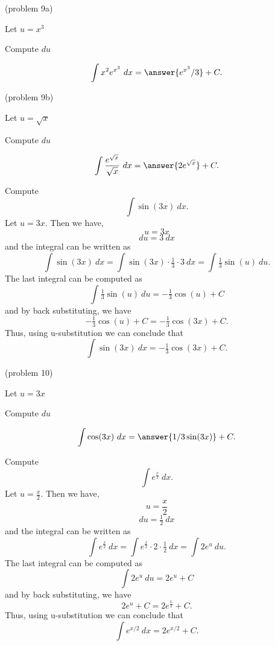 \documentclass{ximera}
\begin{document}
\begin{problem}(problem 9a)
\begin{hint}
Let $u = x^3$
\end{hint}
\begin{hint}
Compute $du$
\end{hint}
\[\int x^2e^{x^3} \ dx = \answer{e^{x^3}/3} +C.\]
\end{problem}



\begin{problem}(problem 9b)
\begin{hint}
Let $u = \sqrt x$
\end{hint}
\begin{hint}
Compute $du$
\end{hint}
\[\int \frac{e^{\sqrt x}}{\sqrt x} \ dx = \answer{2e^{\sqrt x}} +C.\]
\end{problem}


\begin{example}[example 10] Compute 
\[\int \sin(3x) \ dx.\]
Let $u = 3x$.  Then we have,
\[u = 3x\]
\[du = 3 \ dx\]
and the integral can be written as 
\[\int\sin(3x) \ dx =  \int \sin(3x) \cdot \tfrac13\cdot 3 \   dx =   \int \tfrac13 \sin(u) \ du.\]
The last integral can be computed as 
\[ \int \tfrac13 \sin(u) \ du = -\tfrac13 \cos(u) + C\]
and by back substituting, we have 
\[-\tfrac13 \cos(u) + C = -\tfrac13 \cos(3x) + C.\]
Thus, using u-substitution we can conclude that
\[\int \sin(3x) \ dx =  -\tfrac13 \cos(3x) + C.\]
\end{example}

\begin{problem}(problem 10)
\begin{hint}
Let $u = 3x$
\end{hint}
\begin{hint}
Compute $du$
\end{hint}
\[\int \cos(3x) \ dx = \answer{1/3 \sin(3x)} +C.\]
\end{problem}






\begin{example}[example 11] Compute 
\[\int e^{\frac{x}{2}} \ dx.\]
Let $u = \frac{x}{2}$.  Then we have,
\[u = \frac{x}{2}\]
\[du = \tfrac12 \ dx\]
and the integral can be written as 
\[\int e^{\frac{x}{2}} \ dx =  \int e^{\frac{x}{2}} \cdot 2\cdot \tfrac{1}{2}  \   dx =   \int 2e^u \ du.\]
The last integral can be computed as 
\[\int 2e^u \ du = 2 e^u + C\]
and by back substituting, we have 
\[2e^u + C = 2e^{\frac{x}{2}}+ C.\]
Thus, using u-substitution we can conclude that
\[\int e^{x/2} \ dx = 2e^{x/2} + C.\]
\end{example}
\end{document}
